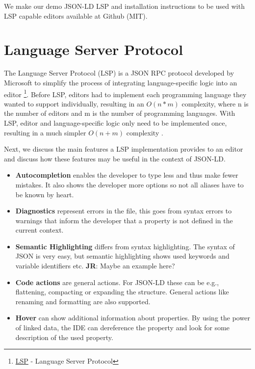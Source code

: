 \documentclass[
]{ceurart}
\newcommand\jr[1]{{\color{Red}\textbf{JR}: #1}}
\begin{document}
We make our demo JSON-LD LSP and installation instructions to be used with LSP capable editors available at Github (MIT).


\section{Language Server Protocol}

The Language Server Protocol (LSP) is a JSON RPC protocol developed by Microsoft to simplify the process of integrating language-specific logic into an editor \footnote{\href{https://microsoft.github.io/language-server-protocol/}{LSP} - Language Server Protocol}. 
Before LSP, editors had to implement each programming language they wanted to support individually, resulting in an \(O(n*m)\) complexity, where n is the number of editors and m is the number of programming languages.
With LSP, editor and language-specific logic only need to be implemented once, resulting in a much simpler \(O(n+m)\) complexity \cite{LSP-Multi}.

Next, we discuss the main features a LSP implementation provides to an editor and discuss how these features may be useful in the context of JSON-LD.

\begin{itemize}
  \item \textbf{Autocompletion} enables the developer to type less and thus make fewer mistakes. It also shows the developer more options so not all aliases have to be known by heart.
  \item \textbf{Diagnostics} represent errors in the file, this goes from syntax errors to warnings that inform the developer that a property is not defined in the current context.
  \item \textbf{Semantic Highlighting} differs from syntax highlighting. The syntax of JSON is very easy, but semantic highlighting shows used keywords and variable identifiers etc. \jr{Maybe an example here?}
  \item \textbf{Code actions} are general actions. For JSON-LD these can be e.g., flattening, compacting or expanding the structure. General actions like renaming and formatting are also supported.
  \item \textbf{Hover} can show additional information about properties. By using the power of linked data, the IDE can dereference the property and look for some description of the used property.
\end{itemize}
\end{document}
